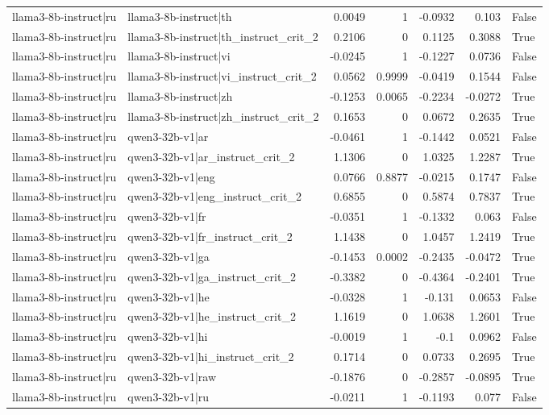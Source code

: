 \begin{table}
\begin{tabular}{l l r r r r l}
llama3-8b-instruct|ru & llama3-8b-instruct|th & 0.0049 & 1 & -0.0932 & 0.103 & False \\
llama3-8b-instruct|ru & llama3-8b-instruct|th_instruct_crit_2 & 0.2106 & 0 & 0.1125 & 0.3088 & True \\
llama3-8b-instruct|ru & llama3-8b-instruct|vi & -0.0245 & 1 & -0.1227 & 0.0736 & False \\
llama3-8b-instruct|ru & llama3-8b-instruct|vi_instruct_crit_2 & 0.0562 & 0.9999 & -0.0419 & 0.1544 & False \\
llama3-8b-instruct|ru & llama3-8b-instruct|zh & -0.1253 & 0.0065 & -0.2234 & -0.0272 & True \\
llama3-8b-instruct|ru & llama3-8b-instruct|zh_instruct_crit_2 & 0.1653 & 0 & 0.0672 & 0.2635 & True \\
llama3-8b-instruct|ru & qwen3-32b-v1|ar & -0.0461 & 1 & -0.1442 & 0.0521 & False \\
llama3-8b-instruct|ru & qwen3-32b-v1|ar_instruct_crit_2 & 1.1306 & 0 & 1.0325 & 1.2287 & True \\
llama3-8b-instruct|ru & qwen3-32b-v1|eng & 0.0766 & 0.8877 & -0.0215 & 0.1747 & False \\
llama3-8b-instruct|ru & qwen3-32b-v1|eng_instruct_crit_2 & 0.6855 & 0 & 0.5874 & 0.7837 & True \\
llama3-8b-instruct|ru & qwen3-32b-v1|fr & -0.0351 & 1 & -0.1332 & 0.063 & False \\
llama3-8b-instruct|ru & qwen3-32b-v1|fr_instruct_crit_2 & 1.1438 & 0 & 1.0457 & 1.2419 & True \\
llama3-8b-instruct|ru & qwen3-32b-v1|ga & -0.1453 & 0.0002 & -0.2435 & -0.0472 & True \\
llama3-8b-instruct|ru & qwen3-32b-v1|ga_instruct_crit_2 & -0.3382 & 0 & -0.4364 & -0.2401 & True \\
llama3-8b-instruct|ru & qwen3-32b-v1|he & -0.0328 & 1 & -0.131 & 0.0653 & False \\
llama3-8b-instruct|ru & qwen3-32b-v1|he_instruct_crit_2 & 1.1619 & 0 & 1.0638 & 1.2601 & True \\
llama3-8b-instruct|ru & qwen3-32b-v1|hi & -0.0019 & 1 & -0.1 & 0.0962 & False \\
llama3-8b-instruct|ru & qwen3-32b-v1|hi_instruct_crit_2 & 0.1714 & 0 & 0.0733 & 0.2695 & True \\
llama3-8b-instruct|ru & qwen3-32b-v1|raw & -0.1876 & 0 & -0.2857 & -0.0895 & True \\
llama3-8b-instruct|ru & qwen3-32b-v1|ru & -0.0211 & 1 & -0.1193 & 0.077 & False \\

\end{tabular}
\end{table}
